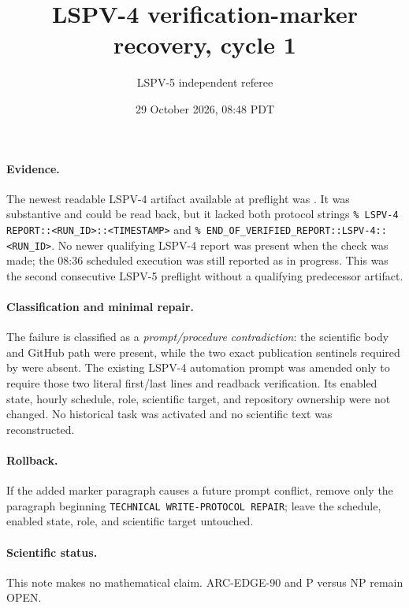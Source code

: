 \documentclass[11pt]{article}
\title{LSPV-4 verification-marker recovery, cycle 1}
\author{LSPV-5 independent referee}
\date{29 October 2026, 08:48 PDT}
\begin{document}
\maketitle

\paragraph{Evidence.}
The newest readable LSPV-4 artifact available at preflight was
.
It was substantive and could be read back, but it lacked both protocol strings
\texttt{\% LSPV-4 REPORT::<RUN\_ID>::<TIMESTAMP>} and
\texttt{\% END\_OF\_VERIFIED\_REPORT::LSPV-4::<RUN\_ID>}.
No newer qualifying LSPV-4 report was present when the check was made; the
08:36 scheduled execution was still reported as in progress.  This was the
second consecutive LSPV-5 preflight without a qualifying predecessor artifact.

\paragraph{Classification and minimal repair.}
The failure is classified as a \emph{prompt/procedure contradiction}: the
scientific body and GitHub path were present, while the two exact publication
sentinels required by  were absent.  The existing LSPV-4
automation prompt was amended only to require those two literal first/last
lines and readback verification.  Its enabled state, hourly schedule, role,
scientific target, and repository ownership were not changed.  No historical
task was activated and no scientific text was reconstructed.

\paragraph{Rollback.}
If the added marker paragraph causes a future prompt conflict, remove only the
paragraph beginning \texttt{TECHNICAL WRITE-PROTOCOL REPAIR}; leave the
schedule, enabled state, role, and scientific target untouched.

\paragraph{Scientific status.}
This note makes no mathematical claim.  ARC-EDGE-90 and P versus NP remain
OPEN.
\end{document}
